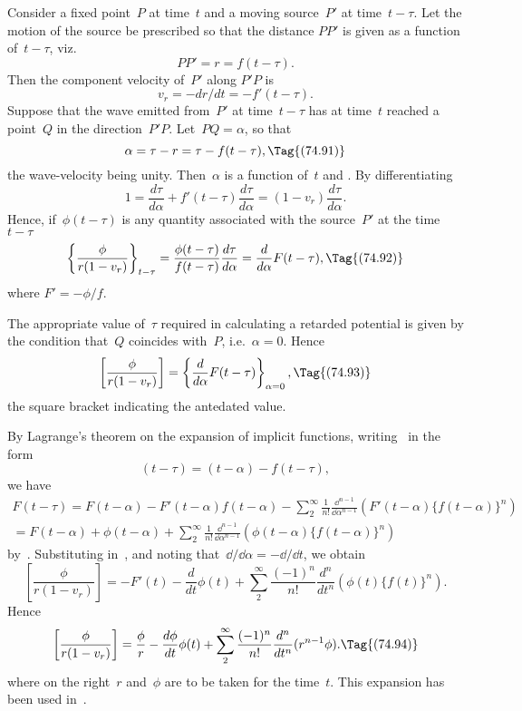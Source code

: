 \documentclass[12pt]{book}
\begin{document}
Consider a fixed point~$P$ at time~$t$ and a moving source~$P'$ at time~$t-\tau$.
Let the motion of the source be prescribed so that the distance $PP'$ is given as a function of~$t-\tau$, viz.
\[
PP' = r = f(t-\tau).
\]
Then the component velocity of~$P'$ along $P'P$ is
\[
v_r = -dr/dt = -f'(t-\tau).
\]
Suppose that the wave emitted from~$P'$ at time~$t-\tau$ has at time~$t$ reached a point~$Q$ in the direction~$P'P$.
Let~$PQ=\alpha$, so that
\[
\alpha = \tau - r = \tau - f(t-\tau),
\Tag{(74.91)}
\]
the wave\hyp{}velocity being unity.
Then~$\alpha$ is a function of~$t$ and .
By differentiating~
\[
1 = \frac{d\tau}{d\alpha} + f'(t-\tau)\frac{d\tau}{d\alpha} = (1-v_r)\frac{d\tau}{d\alpha}.
\]
Hence, if~$\phi(t-\tau)$ is any quantity associated with the source~$P'$ at the time~$t-\tau$
\[
\left\{ \frac{\phi}{r(1-v_r)} \right\}_{t-\tau} = \frac{\phi(t-\tau)}{f(t-\tau)}\frac{d\tau}{d\alpha}=\frac{d}{d\alpha}F(t-\tau),
\Tag{(74.92)}
\]
where $F'=-\phi/f$.

The appropriate value of~$\tau$ required in calculating a retarded potential is given by the condition that~$Q$
coincides with~$P$, i.e.~$\alpha = 0$.
Hence
\[
\left[\frac{\phi}{r(1-v_r)}\right] = \left\{\frac{d}{d\alpha}F(t-\tau)\right\}_{\alpha=0},
\Tag{(74.93)}
\]
the square bracket indicating the antedated value.

By Lagrange's theorem on the expansion of implicit functions, writing~ in the form
\[
(t-\tau) = (t-\alpha)-f(t-\tau),
\]
we have
\begin{multline*}
F(t-\tau) = F(t-\alpha) - F'(t-\alpha)f(t-\alpha) -
                \sum_2^\infty\frac{1}{n!}\frac{\dd^{n-1}}{\dd\alpha^{n-1}}(F'(t-\alpha)\{f(t-\alpha)\}^n)\\
          = F(t-\alpha) + \phi(t-\alpha) +
              \sum_2^\infty\frac{1}{n!}\frac{\dd^{n-1}}{\dd\alpha^{n-1}}(\phi(t-\alpha)\{f(t-\alpha)\}^n)
\end{multline*}
by~.
Substituting in~, and noting that~$\dd/\dd\alpha = -\dd/\dd t$, we obtain
\[
\left[\frac{\phi}{r(1-v_r)}\right]= -F'(t) - \frac{d}{dt}\phi(t) +
                                      \sum_2^\infty\frac{(-1)^n}{n!}\frac{d^n}{dt^n}(\phi(t)\{f(t)\}^n).
\]
Hence
\[
\left[\frac{\phi}{r(1-v_r)}\right]= \frac{\phi}{r} - \frac{d\phi}{dt}\phi(t) +
                                      \sum_2^\infty\frac{(-1)^n}{n!}\frac{d^n}{dt^n}(r^{n-1}\phi).
\Tag{(74.94)}
\]
where on the right~$r$ and~$\phi$ are to be taken for the time~$t$.
This expansion has been used in~.
\end{document}
